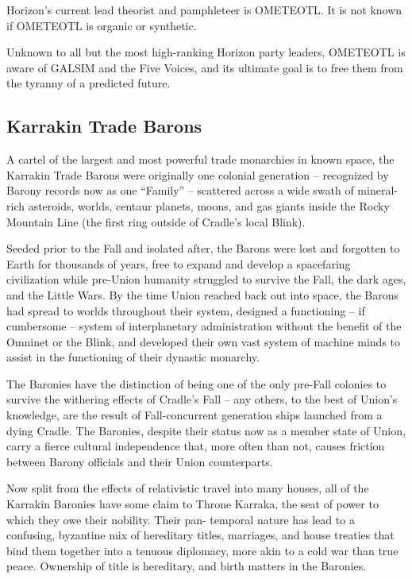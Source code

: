 Horizon's current lead theorist and pamphleteer is OMETEOTL. It is not known if OMETEOTL is
organic or synthetic.

Unknown to all but the most high-ranking Horizon party leaders, OMETEOTL is aware of GALSIM
and the Five Voices, and its ultimate goal is to free them from the tyranny of a predicted future.

\subsection{Karrakin Trade Barons}

A cartel of the largest and most powerful trade monarchies in known space, the Karrakin Trade
Barons were originally one colonial generation -- recognized by Barony records now as one
``Family'' -- scattered across a wide swath of mineral-rich asteroids, worlds, centaur planets,
moons, and gas giants inside the Rocky Mountain Line (the first ring outside of Cradle's local
Blink).

Seeded prior to the Fall and isolated after, the Barons were lost and forgotten to Earth for
thousands of years, free to expand and develop a spacefaring civilization while pre-Union
humanity struggled to survive the Fall, the dark ages, and the Little Wars. By the time Union
reached back out into space, the Barons had spread to worlds throughout their system,
designed a functioning -- if cumbersome -- system of interplanetary administration without the
benefit of the Omninet or the Blink, and developed their own vast system of machine minds to
assist in the functioning of their dynastic monarchy.

The Baronies have the distinction of being one of the only pre-Fall colonies to survive the
withering effects of Cradle's Fall -- any others, to the best of Union's knowledge, are the result of
Fall-concurrent generation ships launched from a dying Cradle. The Baronies, despite their
status now as a member state of Union, carry a fierce cultural independence that, more often
than not, causes friction between Barony officials and their Union counterparts.

Now split from the effects of relativistic travel into many houses, all of the Karrakin Baronies have
some claim to Throne Karraka, the seat of power to which they owe their nobility. Their pan-
temporal nature has lead to a confusing, byzantine mix of hereditary titles, marriages, and house
treaties that bind them together into a tenuous diplomacy, more akin to a cold war than true
peace. Ownership of title is hereditary, and birth matters in the Baronies.


